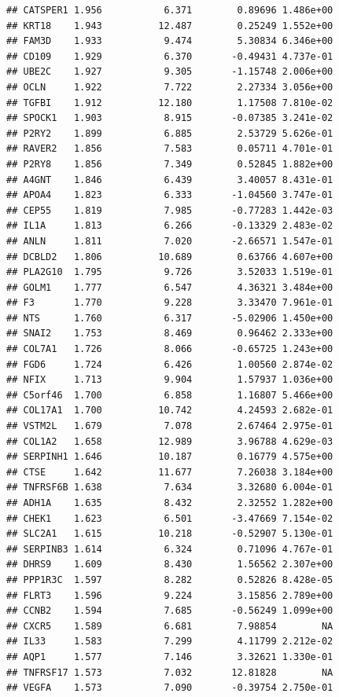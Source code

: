 \documentclass{article}\usepackage[]{graphicx}\usepackage[]{color}
\makeatletter
\newenvironment{kframe}{%
 \def\at@end@of@kframe{}%
 \ifinner\ifhmode%
  \def\at@end@of@kframe{\end{minipage}}%
  \begin{minipage}{\columnwidth}%
 \fi\fi%
 \def\FrameCommand##1{\hskip\@totalleftmargin \hskip-\fboxsep
 \colorbox{shadecolor}{##1}\hskip-\fboxsep
     \hskip-\linewidth \hskip-\@totalleftmargin \hskip\columnwidth}%
 \MakeFramed {\advance\hsize-\width
   \@totalleftmargin\z@ \linewidth\hsize
   \@setminipage}}%
 {\par\unskip\endMakeFramed%
 \at@end@of@kframe}
\newenvironment{knitrout}{}{} %
\makeatother
\begin{document}
\begin{knitrout}
\begin{kframe}
\begin{verbatim}
## CATSPER1 1.956           6.371        0.89696 1.486e+00
## KRT18    1.943          12.487        0.25249 1.552e+00
## FAM3D    1.933           9.474        5.30834 6.346e+00
## CD109    1.929           6.370       -0.49431 4.737e-01
## UBE2C    1.927           9.305       -1.15748 2.006e+00
## OCLN     1.922           7.722        2.27334 3.056e+00
## TGFBI    1.912          12.180        1.17508 7.810e-02
## SPOCK1   1.903           8.915       -0.07385 3.241e-02
## P2RY2    1.899           6.885        2.53729 5.626e-01
## RAVER2   1.856           7.583        0.05711 4.701e-01
## P2RY8    1.856           7.349        0.52845 1.882e+00
## A4GNT    1.846           6.439        3.40057 8.431e-01
## APOA4    1.823           6.333       -1.04560 3.747e-01
## CEP55    1.819           7.985       -0.77283 1.442e-03
## IL1A     1.813           6.266       -0.13329 2.483e-02
## ANLN     1.811           7.020       -2.66571 1.547e-01
## DCBLD2   1.806          10.689        0.63766 4.607e+00
## PLA2G10  1.795           9.726        3.52033 1.519e-01
## GOLM1    1.777           6.547        4.36321 3.484e+00
## F3       1.770           9.228        3.33470 7.961e-01
## NTS      1.760           6.317       -5.02906 1.450e+00
## SNAI2    1.753           8.469        0.96462 2.333e+00
## COL7A1   1.726           8.066       -0.65725 1.243e+00
## FGD6     1.724           6.426        1.00560 2.874e-02
## NFIX     1.713           9.904        1.57937 1.036e+00
## C5orf46  1.700           6.858        1.16807 5.466e+00
## COL17A1  1.700          10.742        4.24593 2.682e-01
## VSTM2L   1.679           7.078        2.67464 2.975e-01
## COL1A2   1.658          12.989        3.96788 4.629e-03
## SERPINH1 1.646          10.187        0.16779 4.575e+00
## CTSE     1.642          11.677        7.26038 3.184e+00
## TNFRSF6B 1.638           7.634        3.32680 6.004e-01
## ADH1A    1.635           8.432        2.32552 1.282e+00
## CHEK1    1.623           6.501       -3.47669 7.154e-02
## SLC2A1   1.615          10.218       -0.52907 5.130e-01
## SERPINB3 1.614           6.324        0.71096 4.767e-01
## DHRS9    1.609           8.430        1.56562 2.307e+00
## PPP1R3C  1.597           8.282        0.52826 8.428e-05
## FLRT3    1.596           9.224        3.15856 2.789e+00
## CCNB2    1.594           7.685       -0.56249 1.099e+00
## CXCR5    1.589           6.681        7.98854        NA
## IL33     1.583           7.299        4.11799 2.212e-02
## AQP1     1.577           7.146        3.32621 1.330e-01
## TNFRSF17 1.573           7.032       12.81828        NA
## VEGFA    1.573           7.090       -0.39754 2.750e-01

\end{verbatim}
\end{kframe}
\end{knitrout}
\end{document}
